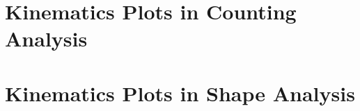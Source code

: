 


\section{Kinematics Plots in Counting Analysis}

\FloatBarrier



\section{Kinematics Plots in Shape Analysis}

\FloatBarrier

\FloatBarrier

\FloatBarrier

\FloatBarrier

\FloatBarrier

\FloatBarrier

\FloatBarrier
